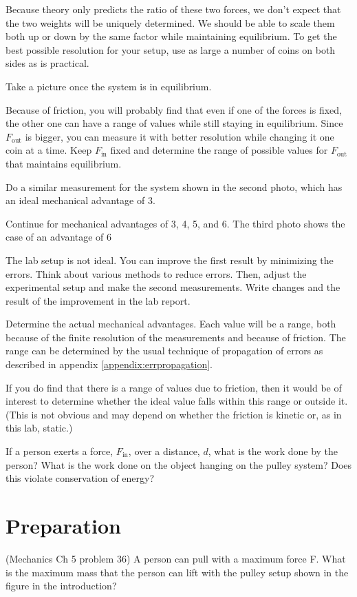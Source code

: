 Because theory only predicts the ratio of these two forces, we don't expect that the two weights will be
uniquely determined. We should be able to scale them both up or down by the same factor while maintaining
equilibrium.  To get the best possible resolution for your setup, use as large a number of coins on both sides as
is practical.

Take a picture once the system is in equilibrium. 

Because of friction, you will probably find that even if one of the forces is fixed, the other one can have a range
of values while still staying in equilibrium. Since $F_\text{out}$ is bigger, you can measure it with better resolution
while changing it one coin at a time. Keep $F_\text{in}$ fixed and determine the range of possible values
for $F_\text{out}$ that maintains equilibrium.


Do a similar measurement for the system shown in the second photo, which has an ideal mechanical advantage of 3.



Continue for mechanical advantages of 3, 4, 5, and 6. The third photo shows the case of an advantage of 6


The lab setup is not ideal. You can improve the first result by minimizing the errors. Think about various methods to reduce errors. Then, adjust the experimental setup and make the second measurements. Write changes and the result of the improvement in the lab report. 

\analysis
Determine the actual mechanical advantages. Each value will be a range, both because of the
finite resolution of the measurements and because of friction. The range can be determined
by the usual technique of propagation of errors as described
in appendix \ref{appendix:errpropagation}.

If you do find that there is a range of values due to friction, then it would be of interest
to determine whether the ideal value falls within this range or outside it. (This is not
obvious and may depend on whether the friction is kinetic or, as in this lab, static.)

If a person exerts a force, $F_\text{in}$, over a distance, $d$, what
is the work done by the person? What is the work done on the object
hanging on the pulley system? Does this violate conservation of
energy?

\section*{Preparation}


\prelabquestion (Mechanics Ch 5 problem 36)
A person can pull with a maximum force F. What is the maximum mass that the person can lift with the pulley setup shown in the figure in the introduction?
